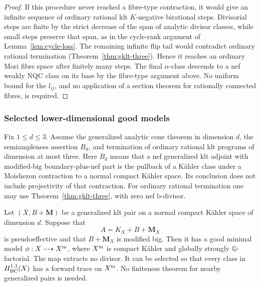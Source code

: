 \begin{proof}
If this procedure never reached a fibre-type contraction, it would
give an infinite sequence of ordinary rational klt $K$-negative
birational steps. Divisorial steps are finite by the strict decrease
of the span of analytic divisor classes, while small steps preserve
that span, as in the cycle-rank argument of Lemma~\ref{lem:cycle-loss}.
The remaining infinite flip tail would contradict ordinary rational
termination (Theorem~\ref{thm:gklt-three}). Hence it reaches an
ordinary Mori fibre space after finitely many steps. The final
$\alpha$-class descends to a nef weakly NQC class on its base by
the fibre-type argument above. No uniform bound for the $l_{ij}$,
and no application of a section theorem for rationally connected
fibres, is required.
\end{proof}


\subsubsection{Selected lower-dimensional good models}

\begin{lemma}
\label{repair:lem:lower-dimensional-good-model}
Fix $1\leq d\leq3$. Assume the generalized analytic cone theorem in
dimension $d$, the semiampleness assertion $B_d$, and termination of
ordinary rational klt programs of dimension at most three. Here $B_d$
means that a nef generalized klt adjoint with modified-big
boundary-plus-nef part is the pullback of a K\"ahler class under a
Moishezon contraction to a normal compact K\"ahler space. Its conclusion does not
include projectivity of that contraction. For ordinary rational
termination one may use Theorem~\ref{thm:gklt-three}, with zero nef
b-divisor.

Let $(X,B+\mathbf M)$ be a generalized klt pair on a normal compact
K\"ahler space of dimension $d$. Suppose that
\[
 A=K_X+B+\mathbf M_X
\]
is pseudoeffective and that $B+\mathbf M_X$ is modified big.
Then it has a good minimal model
$\phi:X\dashrightarrow X^{\rm m}$, where $X^{\rm m}$ is compact
K\"ahler and globally strongly $\mathbb Q$-factorial. The map extracts
no divisor. It can be selected so that every class in
$H^{1,1}_{\rm BC}(X)$ has a forward trace on $X^{\rm m}$.
No finiteness theorem for nearby generalized pairs is needed.
\end{lemma}

